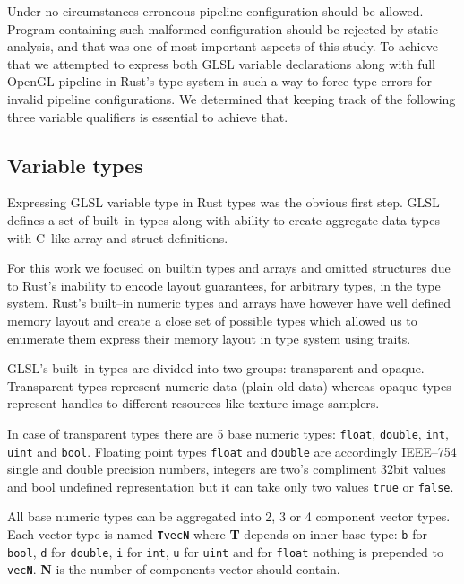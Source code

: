 Under no circumstances erroneous pipeline configuration should be allowed. Program containing such malformed configuration should be rejected by static analysis, and that was one of most important aspects of this study.
To achieve that we attempted to express both GLSL variable declarations along with full OpenGL pipeline in Rust's type system in such a way to force type errors for invalid pipeline configurations.
We determined that keeping track of the following three variable qualifiers is essential to achieve that.

\subsection{Variable types}

Expressing GLSL variable type in Rust types was the obvious first step. GLSL defines a set of built--in types along with ability to create aggregate data types with C--like array and struct definitions.

For this work we focused on builtin types and arrays and omitted structures due to Rust's inability to encode layout guarantees, for arbitrary types, in the type system.
Rust's built--in numeric types and arrays have however have well defined memory layout and create a close set of possible types which allowed us to enumerate them express their memory layout in type system using traits.

GLSL's built--in types are divided into two groups: transparent and opaque.
Transparent types represent numeric data (plain old data) whereas opaque types represent handles to different resources like texture image samplers.

In case of transparent types there are 5 base numeric types: \texttt{float}, \texttt{double}, \texttt{int}, \texttt{uint} and \texttt{bool}.
Floating point types \texttt{float} and \texttt{double} are accordingly IEEE--754 single and double precision numbers, integers are two's compliment 32bit values and bool undefined representation but it can take only two values \texttt{true} or \texttt{false}.

All base numeric types can be aggregated into 2, 3 or 4 component vector types. Each vector type is named \texttt{\textbf{T}vec\textbf{N}}
where \textbf{T} depends on inner base type: \texttt{b} for \texttt{bool}, \texttt{d} for \texttt{double}, \texttt{i} for \texttt{int}, \texttt{u} for \texttt{uint} and for \texttt{float} nothing is prepended to \texttt{vec\textbf{N}}.
\textbf{N} is the number of components vector should contain.

